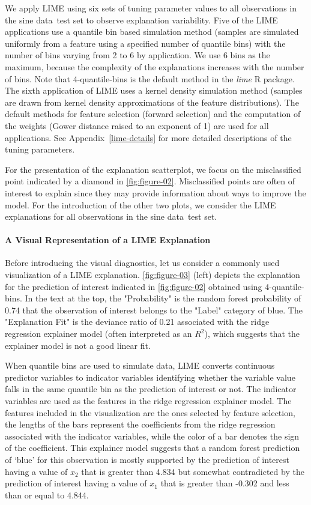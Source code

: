 \documentclass[AMS,STIX2COL]{WileyNJD-v2}\usepackage[]{graphicx}\usepackage[]{color}
\newcommand{\data}{sine data}
\begin{document}
We apply LIME using six sets of tuning parameter values to all observations in the \data \ test set to observe explanation variability. Five of the LIME applications use a  quantile bin based simulation method (samples are simulated uniformly from a feature using a specified number of quantile bins) with the number of bins varying from 2 to 6 by application. We use 6 bins as the maximum, because the complexity of the explanations increases with the number of bins. Note that 4-quantile-bins is  the default method in the \emph{lime} R package. The sixth application of LIME uses a kernel density simulation method (samples are drawn from kernel density approximations of the feature distributions). The default methods for feature selection (forward selection) and the computation of the weights (Gower distance raised to an exponent of 1) are used for all applications. See Appendix~\ref{lime-details} for more detailed descriptions of the tuning parameters.

For the presentation of the explanation scatterplot, we focus on the misclassified point indicated by a diamond in \autoref{fig:figure-02}. Misclassified points are often of interest to explain since they may provide information about ways to improve the model. For the introduction of the other two plots, we consider the LIME explanations for all observations in the \data \ test set.

\paragraph{A Visual Representation of a LIME Explanation}

Before introducing the visual diagnostics, let us consider a commonly used visualization of a LIME explanation. \autoref{fig:figure-03} (left) depicts the explanation for the prediction of interest indicated in \autoref{fig:figure-02} obtained using 4-quantile-bins. In the text at the top, the "Probability" is the random forest probability of 0.74 that the observation of interest belongs to the "Label" category of blue. The "Explanation Fit" is the deviance ratio of 0.21 associated with the ridge regression explainer model (often interpreted as an $R^2$), which suggests that the explainer model is not a good linear fit.

When quantile bins are used to simulate data, LIME converts continuous predictor variables to indicator variables identifying whether the variable value falls in the same quantile bin as the prediction of interest or not. The indicator variables are used as the features in the ridge regression explainer model. The features included in the visualization are the ones selected by feature selection, the lengths of the bars represent the coefficients from the ridge regression associated with the indicator variables, while the color of a bar denotes the sign of the coefficient. This explainer model suggests that a random forest prediction of `blue' for this observation is mostly supported by the prediction of interest having a value of $x_2$ that is greater than 4.834 but somewhat contradicted by the prediction of interest having a value of $x_1$ that is greater than -0.302 and less than or equal to 4.844.
\end{document}
